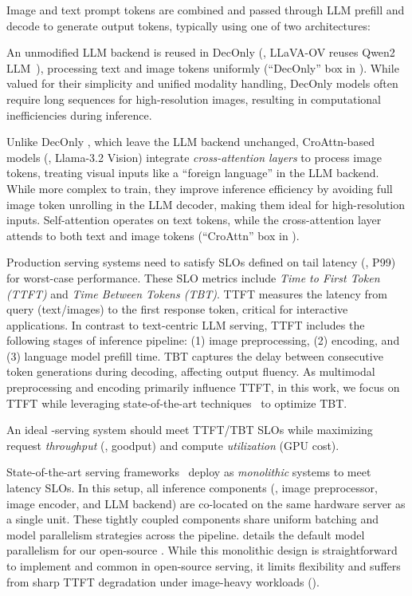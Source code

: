 

Image and text prompt tokens are combined and passed through LLM prefill and decode to generate output tokens, typically using one of two architectures:


An unmodified LLM backend is reused in DecOnly \lmms{} (\eg{}, LLaVA-OV reuses Qwen2 LLM~\cite{llava-ov}), processing text and image tokens uniformly (``DecOnly'' box in ).
While valued for their simplicity and unified modality handling, DecOnly models often require long sequences for high-resolution images, resulting in computational inefficiencies during inference.

Unlike DecOnly \lmms{}, which leave the LLM backend unchanged, CroAttn-based models (\eg{}, Llama-3.2 Vision) integrate \emph{cross-attention layers} to process image tokens, treating visual inputs like a ``foreign language'' in the LLM backend.
While more complex to train, they improve inference efficiency by avoiding full image token unrolling in the LLM decoder, making them ideal for high-resolution inputs.
Self-attention operates on text tokens, while the cross-attention layer attends to both text and image tokens (``CroAttn'' box in ).


Production \lmm{} serving systems need to satisfy SLOs defined on tail latency (\eg{}, P99) for worst-case performance.
These SLO metrics include \emph{Time to First Token (TTFT)} and \emph{Time Between Tokens (TBT)}.
%
TTFT measures the latency from query (text/images) to the first response token, critical for interactive applications.
In contrast to text-centric LLM serving, \lmm{} TTFT includes the following stages of \lmms{} inference pipeline:
(1) image preprocessing,
(2) encoding, and
(3) language model prefill time.
%
TBT captures the delay between consecutive token generations during decoding, affecting output fluency.
As multimodal preprocessing and encoding primarily influence TTFT, in this work, we focus on TTFT while leveraging state-of-the-art techniques~\cite{sarathi-serve,patel2024splitwise} to optimize TBT.

An ideal \lmm{}-serving system should meet TTFT/TBT SLOs while maximizing request \emph{throughput} (\ie{}, goodput) and compute \emph{utilization} (GPU cost).


State-of-the-art serving frameworks~\cite{vllm,hf,deepspeed} deploy \lmms{} as \emph{monolithic} systems to meet latency SLOs.
In this setup, all inference components (\ie{}, image preprocessor, image encoder, and LLM backend) are co-located on the same hardware server as a single unit.
These tightly coupled components share uniform batching and model parallelism strategies across the pipeline.
 details the default model parallelism for our open-source \lmms{}.
While this monolithic design is straightforward to implement and common in open-source \lmm{} serving, it limits flexibility and suffers from sharp TTFT degradation under image-heavy workloads ().